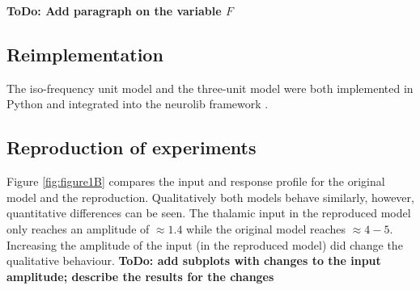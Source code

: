 \textbf{ToDo: Add paragraph on the variable $F$} 


\subsection{Reimplementation}
The iso-frequency unit model and the three-unit model were both implemented in Python and integrated into the neurolib framework 
\supercite{cakan2019neurolib}.


\subsection{Reproduction of experiments}


Figure \ref{fig:figure1B} compares the input and response profile for the original model and the reproduction. Qualitatively both models 
behave similarly, however, quantitative differences can be seen. The thalamic input in the reproduced model only reaches an amplitude of 
$\approx 1.4$ while the original model reaches $\approx 4-5$. Increasing the amplitude of the input (in the reproduced model) did change the 
qualitative behaviour. \textbf{ToDo: add subplots with changes to the input amplitude; describe the results for the changes}

